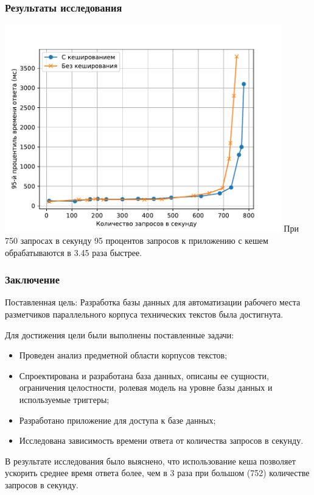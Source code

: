 \documentclass{beamer}
\begin{document}
\begin{frame}
    \frametitle{Результаты исследования}
    \centering
    {
        \includegraphics[width=0.9\textwidth]{img/95-resp-time.pdf}
    }
    \vfill
    При 750 запросах в секунду 95 процентов запросов к приложению с кешем обрабатываются в 3.45 раза быстрее.
\end{frame}

\begin{frame}
    \frametitle{Заключение}
    Поставленная цель: Разработка базы данных для автоматизации рабочего места разметчиков параллельного корпуса технических текстов была достигнута.

    \vfill
    Для достижения цели были выполнены поставленные задачи:
    \begin{itemize}
        \item Проведен анализ предметной области корпусов текстов;
        \item Спроектирована и разработана база данных, описаны ее сущности, ограничения целостности, ролевая модель на уровне базы данных и используемые триггеры;
        \item Разработано приложение для доступа к базе данных;
        \item Исследована зависимость времени ответа от количества запросов в секунду.
    \end{itemize}
    \vfill

    В результате исследования было выяснено, что использование кеша позволяет ускорить среднее время ответа более, чем в 3 раза при большом (752) количестве запросов в секунду.
\end{frame}
\end{document}
